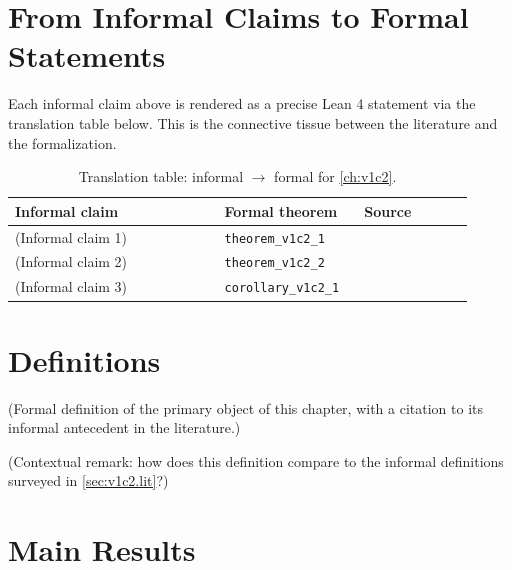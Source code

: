         \section{From Informal Claims to Formal Statements}
        \label{sec:v1c2.bridge}

        Each informal claim above is rendered as a precise Lean 4 statement
        via the translation table below.  This is the connective tissue
        between the literature and the formalization.

        \begin{table}[ht]
        \centering
        \begin{tabular}{p{0.42\linewidth} p{0.28\linewidth} p{0.22\linewidth}}
        \toprule
        \textbf{Informal claim} & \textbf{Formal theorem} & \textbf{Source} \\
        \midrule
        (Informal claim 1) & \texttt{theorem\_v1c2\_1} & \cite{lean4_tpil} \\
        (Informal claim 2) & \texttt{theorem\_v1c2\_2} & \cite{mathlib4} \\
        (Informal claim 3) & \texttt{corollary\_v1c2\_1} & \cite{mac_lane_1998} \\
        \bottomrule
        \end{tabular}
        \caption{Translation table: informal $\rightarrow$ formal for
        \cref{ch:v1c2}.}
        \label{tab:v1c2.bridge}
        \end{table}

        \section{Definitions}

        \begin{definition}
        \label{def:v1c2.1}
          (Formal definition of the primary object of this chapter, with
          a citation to its informal antecedent in the literature.)
        \end{definition}

        \begin{remark}
          (Contextual remark: how does this definition compare to the
          informal definitions surveyed in
          \cref{sec:v1c2.lit}?)
        \end{remark}

        \section{Main Results}

